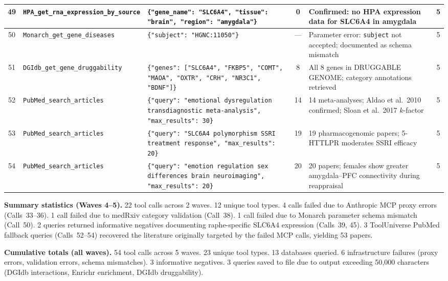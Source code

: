 \begin{longtable}{@{}c p{2.6cm} p{5.2cm} c p{3.8cm} c@{}}
49 &
\texttt{HPA\_get\_rna\_\allowbreak expression\_\allowbreak by\_source} &
\texttt{\{"gene\_name": "SLC6A4", "tissue": "brain", "region": "amygdala"\}} &
0 &
Confirmed: no HPA expression data for SLC6A4 in amygdala &
5 \\
\midrule

50 &
\texttt{Monarch\_\allowbreak get\_gene\_\allowbreak diseases} &
\texttt{\{"subject": "HGNC:11050"\}} &
--- &
Parameter error: \texttt{subject} not accepted; documented as schema mismatch &
5 \\
\midrule

51 &
\texttt{DGIdb\_get\_\allowbreak gene\_\allowbreak druggability} &
\texttt{\{"genes": ["SLC6A4", "FKBP5", "COMT", "MAOA", "OXTR", "CRH", "NR3C1", "BDNF"]\}} &
8 &
All 8 genes in DRUGGABLE GENOME; category annotations retrieved &
5 \\
\midrule

52 &
\texttt{PubMed\_search\_\allowbreak articles} &
\texttt{\{"query": "emotional dysregulation transdiagnostic meta-analysis", "max\_results": 30\}} &
14 &
14 meta-analyses; Aldao et al.\ 2010 confirmed; Sloan et al.\ 2017 $k$-factor &
5 \\
\midrule

53 &
\texttt{PubMed\_search\_\allowbreak articles} &
\texttt{\{"query": "SLC6A4 polymorphism SSRI treatment response", "max\_results": 20\}} &
19 &
19 pharmacogenomic papers; 5-HTTLPR moderates SSRI efficacy &
5 \\
\midrule

54 &
\texttt{PubMed\_search\_\allowbreak articles} &
\texttt{\{"query": "emotion regulation sex differences brain neuroimaging", "max\_results": 20\}} &
20 &
20 papers; females show greater amygdala--PFC connectivity during reappraisal &
5 \\

\end{longtable}
\normalsize

\noindent
\textbf{Summary statistics (Waves 4--5).}
22 tool calls across 2 waves.  12 unique tool types.  4 calls failed due to
Anthropic MCP proxy errors (Calls~33--36).  1 call failed due to medRxiv
category validation (Call~38).  1 call failed due to Monarch parameter schema
mismatch (Call~50).  2 queries returned informative negatives documenting
raphe-specific SLC6A4 expression (Calls~39, 45).  3 ToolUniverse PubMed
fallback queries (Calls~52--54) recovered the literature originally targeted
by the failed MCP calls, yielding 53 papers.

\noindent
\textbf{Cumulative totals (all waves).}
54 tool calls across 5 waves.  23 unique tool types.  13 databases queried.
6 infrastructure failures (proxy errors, validation errors, schema mismatches).
3 informative negatives.  3 queries saved to file due to output exceeding
50{,}000 characters (DGIdb interactions, Enrichr enrichment, DGIdb
druggability).

